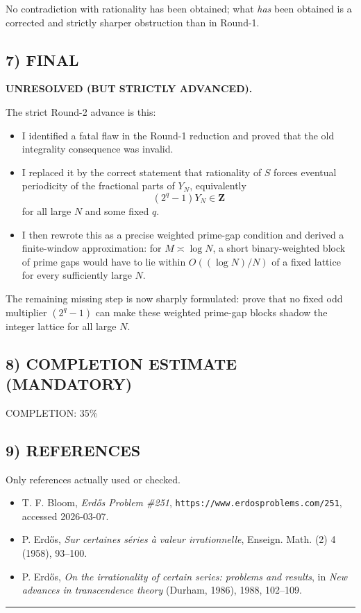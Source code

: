 No contradiction with rationality has been obtained; what \emph{has} been obtained is a corrected and strictly sharper obstruction than in Round-1.

\subsection*{7) FINAL}
\textbf{UNRESOLVED (BUT STRICTLY ADVANCED).}

The strict Round-2 advance is this:

\begin{itemize}
\item I identified a fatal flaw in the Round-1 reduction and proved that the old integrality consequence was invalid.
\item I replaced it by the correct statement that rationality of $S$ forces eventual periodicity of the fractional parts of $Y_N$, equivalently
\[
(2^q-1)Y_N\in\mathbf{Z}
\]
for all large $N$ and some fixed $q$.
\item I then rewrote this as a precise weighted prime-gap condition and derived a finite-window approximation:
for $M\asymp \log N$, a short binary-weighted block of prime gaps would have to lie within $O((\log N)/N)$ of a fixed lattice for every sufficiently large $N$.
\end{itemize}

The remaining missing step is now sharply formulated: prove that no fixed odd multiplier $(2^q-1)$ can make these weighted prime-gap blocks shadow the integer lattice for all large $N$.

\subsection*{8) COMPLETION ESTIMATE (MANDATORY)}
COMPLETION: 35\%

\subsection*{9) REFERENCES}
Only references actually used or checked.

\begin{itemize}
\item T. F. Bloom, \emph{Erd\H{o}s Problem \#251}, \texttt{https://www.erdosproblems.com/251}, accessed 2026-03-07.
\item P. Erd\H{o}s, \emph{Sur certaines s\'eries \`a valeur irrationnelle}, Enseign. Math. (2) 4 (1958), 93--100.
\item P. Erd\H{o}s, \emph{On the irrationality of certain series: problems and results}, in \emph{New advances in transcendence theory} (Durham, 1986), 1988, 102--109.
\end{itemize}

\bigskip
\hrule
\bigskip

